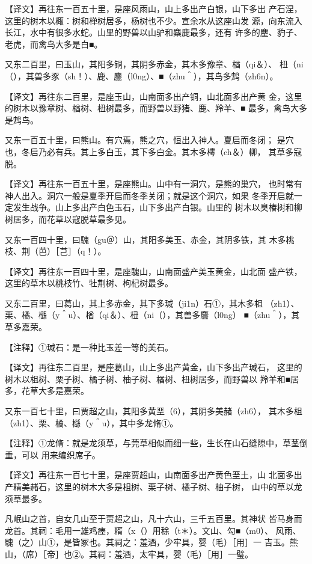 \documentclass[a4paper,12pt,UTF8,twoside]{ctexbook}
\begin{document}
【译文】再往东一百五十里，是座风雨山，山上多出产白银，山下多出 产石涅，这里的树木以棷：树和椫树居多，杨树也不少。宣余水从这座山发 源，向东流入长江，水中有很多水蛇。山里的野兽以山驴和麋鹿最多，还有 许多的麈、豹子、老虎，而禽鸟大多是白■。

又东二百里，曰玉山，其阳多铜，其阴多赤金，其木多豫章、楢（qi＆）、 杻（ni（），其兽多豕（sh！）、鹿、麢（l0ng）、■（zhu＾），其鸟多鸩（zh6n）。

【译文】再往东二百里，是座玉山，山南面多出产铜，山北面多出产黄 金，这里的树木以豫章树、楢树、杻树最多，而野兽以野猪、鹿、羚羊、■ 最多，禽鸟大多是鸩鸟。

又东一百五十里，曰熊山。有穴焉，熊之穴，恒出入神人。夏启而冬闭； 是穴也，冬启乃必有兵。其上多白玉，其下多白金。其木多樗（ch＆）柳， 其草多寇脱。

【译文】再往东一百五十里，是座熊山。山中有一洞穴，是熊的巢穴， 也时常有神人出入。洞穴一般是夏季开启而冬季关闭；就是这个洞穴，如果 冬季开启就一定发生战争。山上多出产白色玉石，山下多出产白银。山里的 树木以臭椿树和柳树居多，而花草以寇脱草最多见。

又东一百四十里，曰騩（gu＠）山，其阳多美玉、赤金，其阴多铁，其 木多桃枝、荆（芭）［芑］（q！）。

【译文】再往东一百四十里，是座騩山，山南面盛产美玉黄金，山北面 盛产铁，这里的草木以桃枝竹、牡荆树、枸杞树最多。

又东二百里，曰葛山，其上多赤金，其下多瑊（ji1n）石①，其木多柤 （zh1）、栗、橘、櫾（y＾u）、楢（qi＆）、杻（ni（），其兽多麢（l0ng） ■（zhu＾），其草多嘉荣。

【注释】①瑊石：是一种比玉差一等的美石。

【译文】再往东二百里，是座葛山，山上多出产黄金，山下多出产瑊石， 这里的树木以柤树、栗子树、橘子树、柚子树、楢树、杻树居多，而野兽以 羚羊和■居多，花草大多是嘉荣。

又东一百七十里，曰贾超之山，其阳多黄垩（6），其阴多美赭（zh6）， 其木多柤（zh1）、栗、橘、櫾（y＾u），其中多龙脩①。

【注释】①龙脩：就是龙须草，与莞草相似而细一些，生长在山石缝隙中，草茎倒垂，可以 用来编织席子。

【译文】再往东一百七十里，是座贾超山，山南面多出产黄色垩土，山 北面多出产精美赭石，这里的树木大多是柤树、栗子树、橘子树、柚子树， 山中的草以龙须草最多。

凡岷山之首，自女几山至于贾超之山，凡十六山，三千五百里。其神状 皆马身而龙首。其祠：毛用一雄鸡瘗，糈（x（）用稌（t＊）。文山、勾■（m0）、 风雨、騩（之）山①，是皆冢也。其祠之：羞酒，少牢具，婴（毛）［用］一 吉玉。熊山，（席）［帝］也②。其祠：羞酒，太牢具，婴（毛）［用］一璧。
\end{document}
